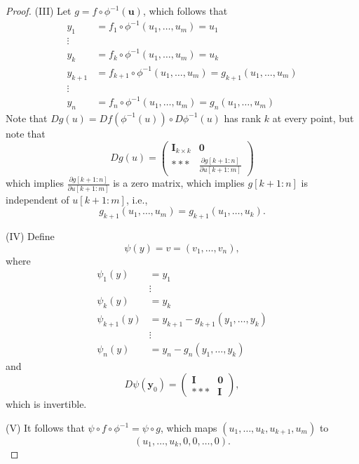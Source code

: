 \begin{proof}
(III) Let $g=f\circ\phi^{-1}(\bm u)$, which follows that
\begin{align*}
y_1&=f_1\circ\phi^{-1}(u_1,\dots,u_m)=u_1\\
\vdots\\
y_k&=f_k\circ\phi^{-1}(u_1,\dots,u_m)=u_k\\
y_{k+1}&=f_{k+1}\circ\phi^{-1}(u_1,\dots,u_m)=g_{k+1}(u_1,\dots,u_m)\\
\vdots\\
y_n&=f_{n}\circ\phi^{-1}(u_1,\dots,u_m)=g_{n}(u_1,\dots,u_m)
\end{align*}
Note that $Dg(u)=Df(\phi^{-1}(u))\circ D\phi^{-1}(u)$ has rank $k$ at every point, but note that
\[
Dg(u)=\begin{pmatrix}
\bm I_{k\times k}&\bm0\\
***&\frac{\partial g[k+1:n]}{\partial u[k+1:m]}
\end{pmatrix}
\]
which implies $\frac{\partial g[k+1:n]}{\partial u[k+1:m]}$ is a zero matrix, which implies $g[k+1:n]$ is independent of $u[k+1:m]$, i.e., 
\[
g_{k+1}(u_1,\dots,u_m)=g_{k+1}(u_1,\dots,u_k). 
\]

(IV) Define
\[
\psi(y)=v=(v_1,\dots,v_n),
\]
where
\begin{align*}
\psi_1(y)&=y_1\\
&\vdots\\
\psi_k(y)&=y_k\\
\psi_{k+1}(y)&=y_{k+1} - g_{k+1}(y_1,\dots,y_k)\\
&\vdots\\
\psi_{n}(y)&=y_n - g_n(y_1,\dots,y_k)
\end{align*}
and 
\[
D\psi(\bm y_0)=\begin{pmatrix}
\bm I&\bm0\\
***&\bm I
\end{pmatrix},
\]
which is invertible. 

(V)  It follows that $\psi\circ f\circ\phi^{-1} = \psi\circ g$, which maps $(u_1,\dots,u_k,u_{k+1},u_m)$ to 
\[
(u_1,\dots,u_k, 0,0,\dots,0).
\]



\end{proof}



















